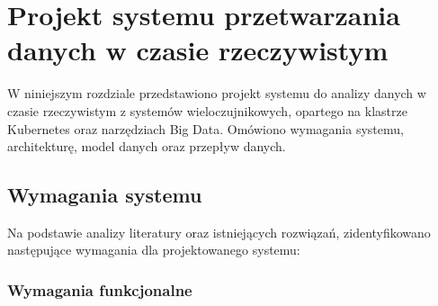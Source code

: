 \section{Projekt systemu przetwarzania danych w czasie rzeczywistym}
\label{sec:projekt_systemu}

W niniejszym rozdziale przedstawiono projekt systemu do analizy danych w czasie rzeczywistym z systemów wieloczujnikowych, opartego na klastrze Kubernetes oraz narzędziach Big Data. Omówiono wymagania systemu, architekturę, model danych oraz przepływ danych.

\subsection{Wymagania systemu}
\label{subsec:wymagania}

Na podstawie analizy literatury oraz istniejących rozwiązań, zidentyfikowano następujące wymagania dla projektowanego systemu:

\subsubsection{Wymagania funkcjonalne}
\label{subsubsec:wymagania_funkcjonalne}

